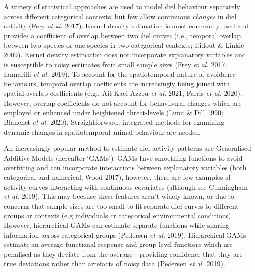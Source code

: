 \documentclass[11pt,a4paper,titlepage,twoside,openright]{style/unimelbthesis}
\begin{document}
\begin{mainmatter}
A variety of statistical approaches are used to model diel behaviour separately across different categorical contexts, but few allow continuous \emph{changes} in diel activity (Frey \emph{et al.} 2017). Kernel density estimation is most commonly used and provides a coefficient of overlap between two diel curves (i.e., temporal overlap between two species or one species in two categorical contexts; Ridout \& Linkie 2009). Kernel density estimation does not incorporate explanatory variables and is susceptible to noisy estimates from small sample sizes (Frey \emph{et al.} 2017; Iannarilli \emph{et al.} 2019). To account for the spatiotemporal nature of avoidance behaviours, temporal overlap coefficients are increasingly being joined with spatial overlap coefficients (e.g., Ait Kaci Azzou \emph{et al.} 2021; Farris \emph{et al.} 2020). However, overlap coefficients do not account for behavioural changes which are employed or enhanced under heightened threat-levels (Lima \& Dill 1990; Blanchet \emph{et al.} 2020). Straightforward, integrated methods for examining dynamic changes in spatiotemporal animal behaviour are needed.

An increasingly popular method to estimate diel activity patterns are Generalised Additive Models (hereafter `GAMs'). GAMs have smoothing functions to avoid overfitting and can incorporate interactions between explanatory variables (both categorical and numerical; Wood 2017), however, there are few examples of activity curves interacting with continuous covariates (although see Cunningham \emph{et al.} 2019). This may because these features aren't widely known, or due to concerns that sample sizes are too small to fit separate diel curves to different groups or contexts (e.g individuals or categorical environmental conditions). However, hierarchical GAMs can estimate separate functions while sharing information across categorical groups (Pedersen \emph{et al.} 2019). Hierarchical GAMs estimate an average functional response and group-level functions which are penalised as they deviate from the average - providing confidence that they are true deviations rather than artefacts of noisy data (Pedersen \emph{et al.} 2019).


\end{mainmatter}
\end{document}
